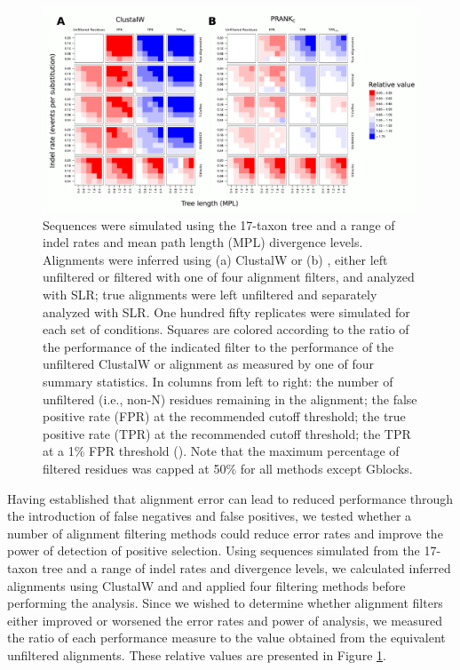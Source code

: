 \documentclass{article}
\begin{document}
\begin{figure}[t]
\begin{center}
\includegraphics[scale=0.65]{fig5.pdf}
\end{center}
\caption{Sequences were simulated using the 17-taxon tree and a range
  of indel rates and mean path length (MPL) divergence
  levels. Alignments were inferred using (a) ClustalW or (b) \prankc,
  either left unfiltered or filtered with one of four alignment
  filters, and analyzed with SLR; true alignments were left unfiltered
  and separately analyzed with SLR. One hundred fifty replicates were
  simulated for each set of conditions. Squares are colored according
  to the ratio of the performance of the indicated filter to the
  performance of the unfiltered ClustalW or \prankc alignment as
  measured by one of four summary statistics. In columns from left to
  right: the number of unfiltered (i.e., non-N) residues remaining
  in the alignment; the false positive rate (FPR) at the recommended
  cutoff threshold; the true positive rate (TPR) at the recommended
  cutoff threshold; the TPR at a 1\% FPR threshold (\tpr). Note that the
  maximum percentage of filtered residues was capped at 50\% for all
  methods except Gblocks.}
\label{fig_5}
\end{figure}

Having established that alignment error can lead to reduced \sw
performance through the introduction of false negatives and false
positives, we tested whether a number of alignment filtering methods
could reduce error rates and improve the power of \sw detection of
positive selection. Using sequences simulated from the 17-taxon tree
and a range of indel rates and divergence levels, we calculated
inferred alignments using ClustalW and \prankc and applied four
filtering methods before performing the \sw analysis. Since we wished
to determine whether alignment filters either improved or worsened the
error rates and power of \sw analysis, we measured the ratio of each
performance measure to the value obtained from the equivalent
unfiltered alignments. These relative values are presented in Figure
\ref{fig_5}.
\end{document}
